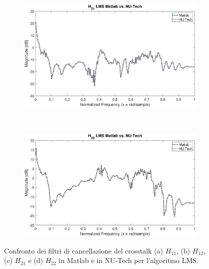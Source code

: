 \documentclass[12pt,a4paper,titlepage]{article}
\begin{document}
\begin{figure}[h]
	\ContinuedFloat
	\centering
	\begin{subfigure}{1\textwidth}
		\includegraphics[width=1\textwidth]{Immagini/H21_LMS_matlab_nutech}
		\caption{}
		\label{fig:H21_LMS_matlab_nutech}
	\end{subfigure}\\
	\begin{subfigure}{1\textwidth}
		\includegraphics[width=1\textwidth]{Immagini/H22_LMS_matlab_nutech}
		\caption{}
		\label{fig:H22_LMS_matlab_nutech}
	\end{subfigure}
		\caption{Confronto dei filtri di cancellazione del crosstalk (a) $H_{11}$, (b) $H_{12}$, (c) $H_{21}$ e (d) $H_{22}$ in Matlab e in NU-Tech per l'algoritmo LMS.}
		\label{fig:confronto_filtri_matlab_nutech_lms}
\end{figure}
\end{document}
